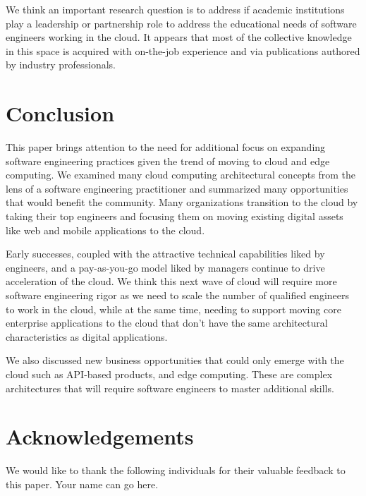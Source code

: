 \documentclass[conference]{IEEEtran}
\begin{document}
We think an important research question is to address if academic institutions play a leadership or partnership role to address the educational needs of software engineers working in the cloud.  It appears that most of the collective knowledge in this space is acquired with on-the-job experience and via publications authored by industry professionals.  

\section{Conclusion}
This paper brings attention to the need for additional focus on expanding software engineering practices given the trend of moving to cloud and edge computing.  We examined many cloud computing architectural concepts from the lens of a software engineering practitioner and summarized many opportunities that would benefit the community. Many organizations transition to the cloud by taking their top engineers and focusing them on moving existing digital assets like web and mobile applications to the cloud.

Early successes, coupled with the attractive technical capabilities liked by engineers, and a pay-as-you-go model liked by managers continue to drive acceleration of the cloud.  We think this next wave of cloud will require more software engineering rigor as we need to scale the number of qualified engineers to work in the cloud, while at the same time, needing to support moving core enterprise applications to the cloud that don't have the same architectural characteristics as digital applications. 

We also discussed new business opportunities that could only emerge with the cloud such as API-based products, and edge computing.  These are complex architectures that will require software engineers to master additional skills.

\section{Acknowledgements}
We would like to thank the following individuals for their valuable feedback to this paper. Your name can go here. 



\iftrue
\vspace{1cm}
\end{document}
